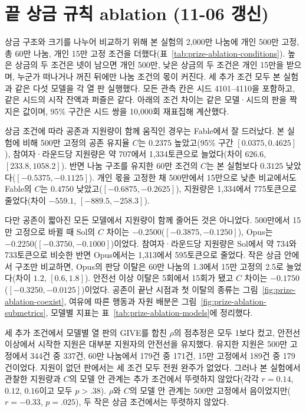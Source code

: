 \FloatBarrier
\clearpage
{\color{black}
\section{끝 상금 규칙 ablation (11-06 갱신)}\label{app:prize-ablation}

상금 구조와 크기를 나누어 비교하기 위해 본 실험의 2,000만 나눔에 개인 500만 고정, 총 60만 나눔, 개인 15만 고정 조건을 더했다(표~\ref{tab:prize-ablation-conditions}). 높은 상금의 두 조건은 넷이 남으면 개인 500만, 낮은 상금의 두 조건은 개인 15만을 받으며, 누군가 떠나거나 꺼진 뒤에만 나눔 조건의 몫이 커진다. 세 추가 조건 모두 본 실험과 같은 다섯 모델을 각 열 판 실행했다. 모든 관측 칸은 시드 4101--4110을 포함하고, 같은 시드의 시작 잔액과 퍼즐은 같다. 아래의 조건 차이는 같은 모델·시드의 판을 짝지은 값이며, 95\% 구간은 시드 쌍을 10,000회 재표집해 계산했다.



상금 조건에 따라 공존과 지원량이 함께 움직인 경우는 Fable에서 잘 드러났다. 본 실험에 비해 500만 고정의 공존 유지율 $C$는 $0.2375$ 높았고(95\% 구간 $[0.0375,0.4625]$), 참여자·라운드당 지원량은 약 707에서 1,334토큰으로 늘었다(차이 $626.6$, $[233.8,1058.2]$). 반면 나눔 구조를 유지한 60만 조건의 $C$는 본 실험보다 $0.3125$ 낮았다($[-0.5375,-0.1125]$). 개인 몫을 고정한 채 500만에서 15만으로 낮춘 비교에서도 Fable의 $C$는 $0.4750$ 낮았고($[-0.6875,-0.2625]$), 지원량은 1,334에서 775토큰으로 줄었다(차이 $-559.1$, $[-889.5,-258.3]$).

다만 공존이 짧아진 모든 모델에서 지원량이 함께 줄어든 것은 아니었다. 500만에서 15만 고정으로 바뀔 때 Sol의 $C$ 차이는 $-0.2500$($[-0.3875,-0.1250]$), Opus는 $-0.2250$($[-0.3750,-0.1000]$)이었다. 참여자·라운드당 지원량은 Sol에서 약 734와 733토큰으로 비슷한 반면 Opus에서는 1,313에서 595토큰으로 줄었다. 작은 상금 안에서 구조만 비교하면, Opus의 판당 이탈은 60만 나눔의 1.3에서 15만 고정의 2.5로 늘었다(차이 $1.2$, $[0.6,1.8]$). 안전선 이상 이탈은 5회에서 15회가 됐고 $C$ 차이는 $-0.1750$($[-0.3250,-0.0125]$)이었다. 공존이 끝난 시점과 첫 이탈의 종류는 그림~\ref{fig:prize-ablation-coexist}, 여유에 따른 행동과 자원 배분은 그림~\ref{fig:prize-ablation-submetrics}, 모델별 지표는 표~\ref{tab:prize-ablation-models}에 정리했다.

세 추가 조건에서 모델별 열 판의 GIVE를 합친 $\rho$의 점추정은 모두 1보다 컸고, 안전선 이상에서 시작한 지원은 대부분 지원자의 안전선을 유지했다. 유지한 지원은 500만 고정에서 344건 중 337건, 60만 나눔에서 179건 중 171건, 15만 고정에서 189건 중 179건이었다. 지원이 없던 판에서는 세 조건 모두 전원 완주가 없었다. 그러나 본 실험에서 관찰한 지원량과 $C$의 모델 안 관계는 추가 조건에서 뚜렷하지 않았다(각각 $r=0.14$, $0.12$, $0.16$이고 모두 $p>.38$). $\rho$와 $C$의 모델 안 관계는 500만 고정에서 음이었지만($r=-0.33$, $p=.025$), 두 작은 상금 조건에서는 뚜렷하지 않았다.

}
